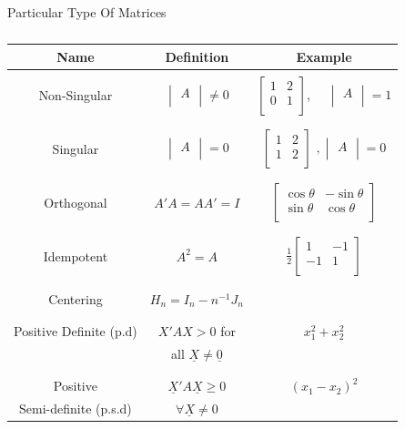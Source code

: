 \documentclass[11pt,a4paper]{article}
\theoremstyle{definition}
\begin{document}
\begin{table}[H]
\centering
Particular Type Of Matrices\\
\begin{tabular}{|c|c|c|}
\hline
Name & Definition & Example\\
\hline
&&\\
Non-Singular & $\begin{vmatrix}
A\\
\end{vmatrix}\neq 0$ & $\begin{bmatrix}
1 & 2\\
0 & 1\\
\end{bmatrix}$, $\quad \begin{vmatrix}
A\\
\end{vmatrix} =1$\\
&&\\
\hline
&&\\
Singular & $\begin{vmatrix}
A\\
\end{vmatrix} = 0$ & $\begin{bmatrix}
1 & 2\\
1 & 2\\
\end{bmatrix}$ $, \begin{vmatrix}
A\\
\end{vmatrix}=0$\\
&&\\
\hline
&&\\
Orthogonal & $A'A = AA' =I$ & $\begin{bmatrix}
\cos \theta & -\sin \theta\\
\sin \theta & \cos \theta\\
\end{bmatrix}$\\
&&\\
\hline
&&\\
Idempotent & $A^2 =A$ & $\frac{1}{2}\begin{bmatrix}
1 & -1\\
-1 & 1\\
\end{bmatrix}$\\
&&\\
\hline
&&\\
Centering & $H_n = I_n - n^{-1}J_n$ & \\
&&\\
\hline
&&\\
Positive Definite (p.d) & $X'AX>0$ for & $x^2_1 + x_2^2$\\
                        & all $\underline{X}\neq \underline{0}$ & \\
&&\\
\hline
&&\\
Positive & $\underline{X}'A\underline{X}\geq 0$ & $(x_1-x_2)^2$\\
Semi-definite (p.s.d) & $\forall \underline{X}\neq 0$ &  \\
\hline
\end{tabular}
\caption{}
\end{table}
\end{document}
